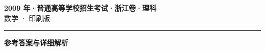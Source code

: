 \documentclass[zihao=5, a4paper]{ctexart}
\begin{document}
\begin{center}
  {\Large\bfseries 2009 年·普通高等学校招生考试·浙江卷·理科}\\[4pt]
  {\large 数学 · 印刷版}
\end{center}
\medskip
{}

\par\bigskip\hrule\bigskip
{}
\begin{center}{\large\bfseries 参考答案与详细解析}\end{center}
\smallskip

\end{document}

